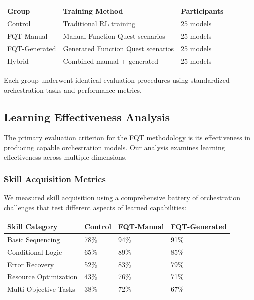 \begin{center}
\begin{tabular}{@{}lll@{}}
\toprule
\textbf{Group} & \textbf{Training Method} & \textbf{Participants} \\
\midrule
Control & Traditional RL training & 25 models \\
FQT-Manual & Manual Function Quest scenarios & 25 models \\
FQT-Generated & Generated Function Quest scenarios & 25 models \\
Hybrid & Combined manual + generated & 25 models \\
\bottomrule
\end{tabular}
\end{center}

Each group underwent identical evaluation procedures using standardized orchestration tasks and performance metrics.

\subsection*{Learning Effectiveness Analysis}

The primary evaluation criterion for the FQT methodology is its effectiveness in producing capable orchestration models. Our analysis examines learning effectiveness across multiple dimensions.

\subsubsection*{Skill Acquisition Metrics}

We measured skill acquisition using a comprehensive battery of orchestration challenges that test different aspects of learned capabilities:

\begin{center}
\begin{tabular}{@{}llll@{}}
\toprule
\textbf{Skill Category} & \textbf{Control} & \textbf{FQT-Manual} & \textbf{FQT-Generated} \\
\midrule
Basic Sequencing & 78\% & 94\% & 91\% \\
Conditional Logic & 65\% & 89\% & 85\% \\
Error Recovery & 52\% & 83\% & 79\% \\
Resource Optimization & 43\% & 76\% & 71\% \\
Multi-Objective Tasks & 38\% & 72\% & 67\% \\
\bottomrule
\end{tabular}
\end{center}

